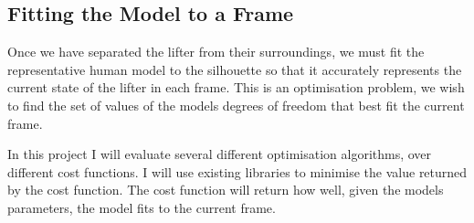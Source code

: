 \subsection{Fitting the Model to a Frame}

Once we have separated the lifter from their surroundings, we must fit the representative human model to the silhouette so that it accurately represents the current state of the lifter in each frame. This is an optimisation problem, we wish to find the set of values of the models degrees of freedom that best fit the current frame.

In this project I will evaluate several different optimisation algorithms, over different cost functions. I will use existing libraries to minimise the value returned by the cost function. The cost function will return how well, given the models parameters, the model fits to the current frame.

